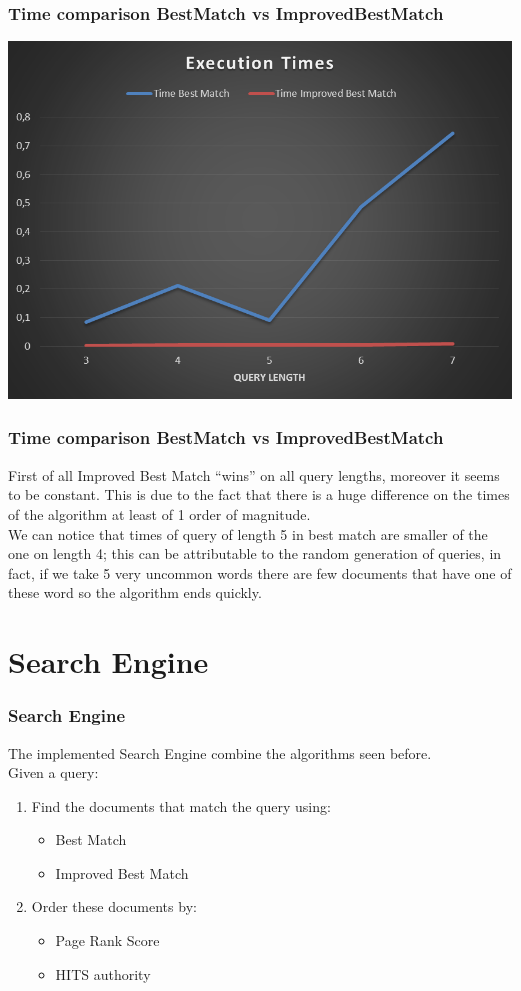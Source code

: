 \documentclass{beamer}
\begin{document}
\begin{frame}
	\frametitle{Time comparison BestMatch vs ImprovedBestMatch}
	\begin{center}
	\includegraphics[scale=0.32]{img/Matching/Tempi.PNG} 
	\end{center}
\end{frame}

\begin{frame}
\frametitle{Time comparison BestMatch vs ImprovedBestMatch}
First of all  Improved Best Match ``\alert{wins}'' on all query lengths, moreover it seems to be constant. This is due to the fact that there is a huge difference on the times of the algorithm at least of 1 order of magnitude.\\
\medskip
We can notice that times of query of length 5 in best match are smaller of the one on length 4; this can be attributable to the random generation of queries, in fact, if we take 5 very uncommon words there are \alert{few} documents that have one of these word so the algorithm ends quickly. 
\end{frame}

\section{Search Engine}
\begin{frame}
\frametitle{Search Engine}
The implemented Search Engine combine the algorithms seen before.\\ 
Given a query:
\begin{enumerate}
\item Find the documents that match the query using:
\begin{itemize}
\item Best Match
\item Improved Best Match
\end{itemize}
\item Order these documents by:
\begin{itemize}
\item Page Rank Score
\item HITS authority
\end{itemize}
\end{enumerate}
\end{frame}
\end{document}
